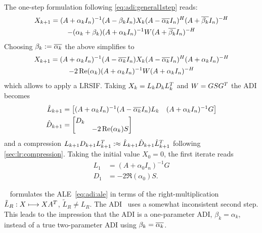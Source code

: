 The one-step formulation following \eqref{eq:adi:general1step} reads:
\begin{multline}
  X_{k+1} =
  (A + \alpha_k I_n)^{-1}
  (A - \beta_k I_n)
  X_k
  (A - \conj{\alpha_k} I_n)^\HT
  (A + \conj{\beta_k} I_n)^{-H}
  \\
  - (\alpha_k + \beta_k)
  (A + \alpha_k I_n)^{-1}
  W
  (A + \conj{\beta_k} I_n)^{-\HT}
\end{multline}
Choosing $\beta_k := \conj{\alpha_k}$
the above simplifies to
\begin{multline}
  X_{k+1} =
  (A + \alpha_k I_n)^{-1}
  (A - \conj{\alpha_k} I_n)
  X_k
  (A - \conj{\alpha_k} I_n)^\HT
  (A + \alpha_k I_n)^{-H}
  \\
  - 2\Re(\alpha_k)
  (A + \alpha_k I_n)^{-1}
  W
  (A + \alpha_k I_n)^{-\HT}
\end{multline}
which allows to apply a \ac{LRSIF}.
Taking $X_k = L_k D_k L_k^T$ and $W = GSG^T$
the \ac{ADI} becomes
\begin{align*}
  \hat L_{k+1} &= \begin{bmatrix}
    (A+\alpha_k I_n)^{-1} (A - \conj{\alpha_k} I_n) L_k &
    (A+\alpha_k I_n)^{-1} G
  \end{bmatrix} \\
  \hat D_{k+1} &= \begin{bmatrix}
    D_k \\
    & -2\Re(\alpha_k) S
  \end{bmatrix}
\end{align*}
and a compression $L_{k+1} D_{k+1} L_{k+1}^T :\approx \hat L_{k+1} \hat D_{k+1} \hat L_{k+1}^T$
following \autoref{sec:lr:compression}.
Taking the initial value $X_0 = 0$, the first iterate reads
\begin{align*}
  L_1 &= (A+\alpha_0 I_n)^{-1} G \\
  D_1 &= -2\Re(\alpha_0) S
  .
\end{align*}

\begin{remark}
  \citeauthor{Lang2017}~\cite{Lang2017} formulates the \ac{ALE}~\eqref{eq:adi:ale} in terms of the
  right-multiplication $\tilde L_R :X \longmapsto XA^T$, $\tilde L_R \neq L_R$.
  The ADI~\cite[Equation~(2.23)]{Lang2017} uses a somewhat inconsistent second step.
  This leads to the impression that the ADI is a one-parameter ADI, $\beta_k=\alpha_k$,
  instead of a true two-parameter ADI using $\beta_k = \conj{\alpha_k}$.
\end{remark}


